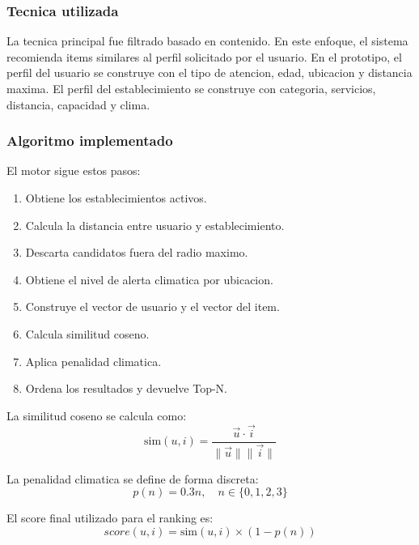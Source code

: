 \documentclass[12pt,a4paper]{article}
\begin{document}
\subsubsection{Tecnica utilizada}
La tecnica principal fue filtrado basado en contenido. En este enfoque, el sistema recomienda items similares al perfil solicitado por el usuario. En el prototipo, el perfil del usuario se construye con el tipo de atencion, edad, ubicacion y distancia maxima. El perfil del establecimiento se construye con categoria, servicios, distancia, capacidad y clima.

\subsubsection{Algoritmo implementado}
El motor sigue estos pasos:

\begin{enumerate}[leftmargin=*]
  \item Obtiene los establecimientos activos.
  \item Calcula la distancia entre usuario y establecimiento.
  \item Descarta candidatos fuera del radio maximo.
  \item Obtiene el nivel de alerta climatica por ubicacion.
  \item Construye el vector de usuario y el vector del item.
  \item Calcula similitud coseno.
  \item Aplica penalidad climatica.
  \item Ordena los resultados y devuelve Top-N.
\end{enumerate}

La similitud coseno se calcula como:
\begin{equation}
\mathrm{sim}(u,i)=\frac{\vec{u}\cdot\vec{i}}{\|\vec{u}\|\|\vec{i}\|}
\label{eq:coseno}
\end{equation}

La penalidad climatica se define de forma discreta:
\begin{equation}
p(n)=0.3n,\quad n\in\{0,1,2,3\}
\label{eq:penalidad}
\end{equation}

El score final utilizado para el ranking es:
\begin{equation}
score(u,i)=\mathrm{sim}(u,i)\times(1-p(n))
\label{eq:score}
\end{equation}
\end{document}
